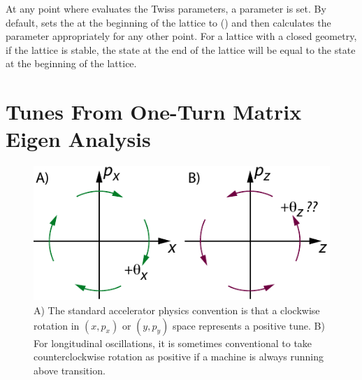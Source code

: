 At any point where \bmad evaluates the Twiss parameters, a  parameter is set. By
default, \bmad sets the  at the beginning of the lattice to 
() and then calculates the  parameter appropriately for any other
point. For a lattice with a closed geometry, if the lattice is stable, the  state at
the end of the lattice will be equal to the state at the beginning of the lattice.

\section{Tunes From One-Turn Matrix Eigen Analysis}
\label{s:eigen.tune}

\begin{figure}[tb]
  \centering
  \includegraphics[width=5in]{tune.pdf}
  \caption[Illustration of a positive tune]{A) The standard accelerator physics convention is that 
a clockwise rotation in $(x, p_x)$ or $(y, p_y)$ space represents a positive tune. B) For longitudinal
oscillations, it is sometimes conventional to take counterclockwise rotation as positive if a machine
is always running above transition.}
  \label{f:tune}
\end{figure}

